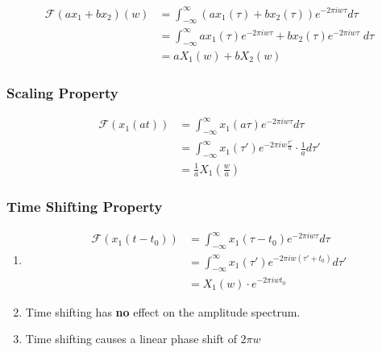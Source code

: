 \begin{equation}
    \begin{aligned}
        \mathcal{F}(a x_1 + b x_2)\left( w \right) &= \int_{-\infty}^{\infty} \left( a x_1(\tau) + b x_2(\tau) \right) e^{-2\pi i w \tau} d\tau \\
        &= \int_{-\infty}^{\infty} a x_1(\tau) e^{-2\pi i w \tau} + b x_2(\tau) e^{-2\pi i w \tau} \; d\tau \\
        &= a X_1(w) + b X_2(w)
    \end{aligned}
\end{equation}


\subsubsection{Scaling Property}

\begin{equation}
    \begin{aligned}
        \mathcal{F}(x_1(at)) &= \int_{-\infty}^{\infty} x_1(a\tau) e^{-2\pi i w \tau} d\tau \\
        &= \int_{-\infty}^{\infty} x_1(\tau') e^{-2\pi i w \frac{\tau'}{a}} \cdot \frac{1}{a} d\tau' \\
        &= \frac{1}{a} X_1\left(\frac{w}{a} \right)
    \end{aligned}
\end{equation}


\subsubsection{Time Shifting Property}

\begin{enumerate}
    \item  \begin{equation}
        \begin{aligned}
            \mathcal{F}(x_1(t - t_0)) &= \int_{-\infty}^{\infty} x_1(\tau - t_0) e^{-2\pi i w \tau} d\tau \\
            &= \int_{-\infty}^{\infty} x_1(\tau') e^{-2\pi i w \left( \tau' + t_0 \right)} d\tau' \\
            &= X_1\left(w \right) \cdot e^{-2\pi i w t_0}
        \end{aligned}
    \end{equation}

    \item Time shifting has \textbf{no} effect on the amplitude spectrum.
    \item Time shifting causes a linear phase shift of $2\pi w$

\end{enumerate}

